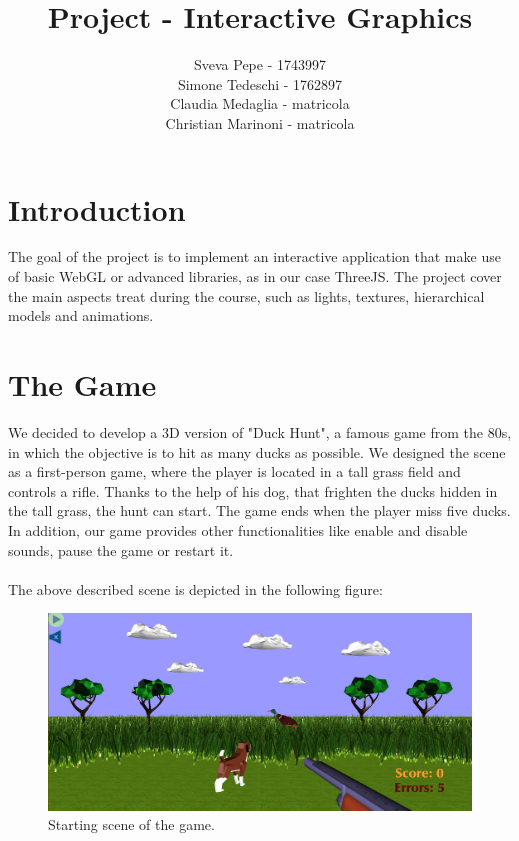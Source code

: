\documentclass[12pt,a4paper]{article}
\title{Project - Interactive Graphics}
\author{Sveva Pepe - 1743997 \\ 
        Simone Tedeschi - 1762897 \\
        Claudia Medaglia - matricola \\
        Christian Marinoni - matricola}
\date{}
\begin{document}
\maketitle
\section{Introduction}
The goal of the project is to implement an interactive application 
that make use of basic WebGL or advanced libraries, as in our case ThreeJS. The project 
cover the main aspects treat during the course, such as 
lights, textures, hierarchical models and animations.
\section{The Game}
We decided to develop a 3D version of "Duck Hunt", a  
famous game from the 80s, in which the objective is to hit  
as many ducks as possible. We designed the
scene as a first-person game, where the player is located 
in a tall grass field and controls a rifle. 
Thanks to the help of his dog, that frighten the ducks hidden 
in the tall grass, the hunt can start. 
The game ends when the player miss five ducks.
In addition, our game provides other functionalities like enable 
and disable sounds, pause the game or restart it.
\\ \\The above described scene is depicted in the following figure:
\begin{figure}[hbt!]
    \centering
    \includegraphics[width=1\textwidth]{game.png}
    \caption{Starting scene of the game.}
    \label{fig1}
\end{figure}
\end{document}
